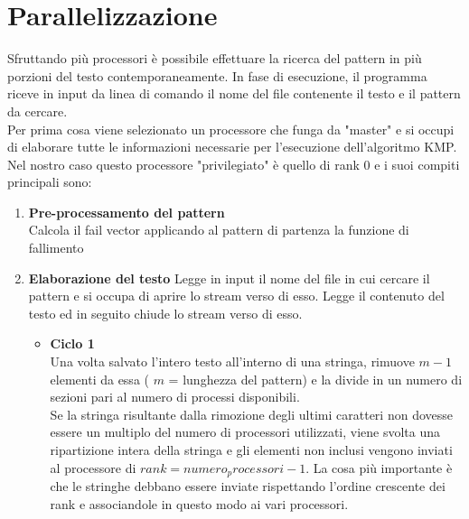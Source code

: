 \section{Parallelizzazione}\label{Parallel}
Sfruttando più processori è possibile effettuare la ricerca del pattern in più porzioni del testo contemporaneamente. In fase di esecuzione, il programma riceve in input da linea di comando il nome del file contenente il testo e il pattern da cercare. \\ Per prima cosa viene selezionato un processore che funga da "master" e si occupi di elaborare tutte le informazioni necessarie per l'esecuzione dell'algoritmo KMP. Nel nostro caso questo processore "privilegiato" è quello di rank 0 e i suoi compiti principali sono:
\begin{enumerate}

\item{\textbf{Pre-processamento del pattern}\\
Calcola il fail vector applicando al pattern di partenza la funzione di fallimento
}
\item{\textbf{Elaborazione del testo}
Legge in input il nome del file in cui cercare il pattern e si occupa di aprire lo stream verso di esso. Legge il contenuto del testo ed in seguito chiude lo stream verso di esso.
\begin{itemize}
\item{\textbf{Ciclo 1}\\
Una volta salvato l'intero testo all'interno di una stringa, rimuove $m-1$ elementi da essa ( $m$ = lunghezza del pattern) e la divide in un numero di sezioni pari al numero di processi disponibili.\\Se la stringa risultante dalla rimozione degli ultimi caratteri non dovesse essere un multiplo del numero di processori utilizzati, viene svolta una ripartizione intera della stringa e gli elementi non inclusi vengono inviati al processore di $rank=numero_processori-1$. La cosa più importante è che le stringhe debbano essere inviate rispettando l'ordine crescente dei rank e associandole in questo modo ai vari processori.
\begin{comment}
\begin{figure}[h]
\centering
\texttt{[image: Path]}
\caption{\footnotesize{}}
\label{Esempio_Ciclo1}
\end{figure}
\end{comment}

}
\end{itemize}}
\end{enumerate}
